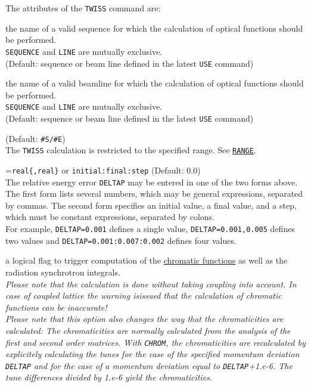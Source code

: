 The  attributes of the \texttt{TWISS} command are: 
\begin{madlist}
   the name of a valid sequence for
  which the calculation of optical functions should be performed. \\ 
  \texttt{SEQUENCE} and \texttt{LINE} are mutually exclusive.\\
  (Default: sequence or beam line defined in the latest \texttt{USE}
  command) 

   the name of a valid beamline for which
  the calculation of optical functions should be performed. \\
  \texttt{SEQUENCE} and \texttt{LINE} are mutually exclusive.\\
  (Default: sequence or beam line defined in the latest \texttt{USE}
  command) 
  
   (Default: \texttt{\#S/\#E})\\
  The \texttt{TWISS} calculation is restricted to the specified range.
  See \hyperref[sec:range]{\texttt{RANGE}}.  

  =\texttt{real\{,real\}} or \texttt{initial:final:step}
  (Default: 0.0)\\ 
  The relative energy error \texttt{DELTAP} may be entered in one of the
  two forms above. \\ 
  The first form lists several numbers, which may be general expressions,
  separated by commas. The second form specifies an initial value, a final
  value, and a step, which must be constant expressions, separated by
  colons. \\
  For example, \texttt{DELTAP=0.001} defines a single value, 
  \texttt{DELTAP=0.001,0.005} defines two values and 
  \texttt{DELTAP=0.001:0.007:0.002} defines four values. 


   a logical flag to trigger computation of the
  \hyperref[subsec:tables-chrom]{chromatic functions} as well as the radiation 
  synchrotron integrals. \\
  \textit{Please note that the calculation is done without taking coupling into 
  account. In case of coupled lattice the warning isissued that the calculation 
  of chromatic functions can be inaccurate!}\\
  \textit{Please note that this option also changes the way that the
    chromaticities are calculated: The chromaticities are normally
    calculated from the analysis of the first and second order
    matrices. With \texttt{CHROM}, the chromaticities are recalculated by
    explicitely calculating the tunes for the case of the specified momentum
    deviation \texttt{DELTAP} and for the case of a momentum deviation equal
    to \texttt{DELTAP}+1.e-6. The tune differences divided by 1.e-6 yield the
    chromaticities.}


\end{madlist}
